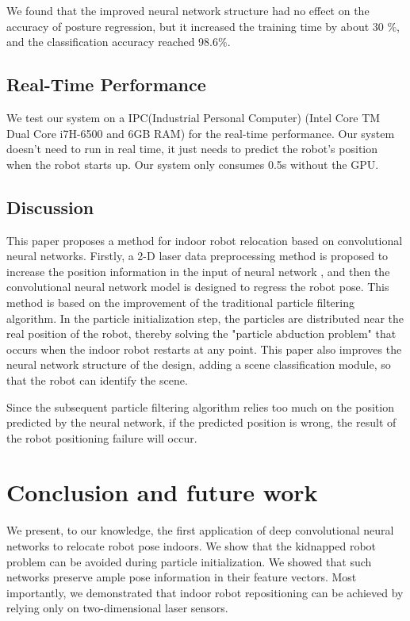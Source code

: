 \documentclass[journal]{IEEEtran}
\begin{document}
We found that the improved neural network structure had no effect on the accuracy of posture regression, but it increased the training time by about 30 $\%$, and the classification accuracy reached 98.6$\%$.


\subsection{Real-Time Performance}

We test our system on a IPC(Industrial Personal Computer) (Intel Core TM Dual Core i7H-6500 and 6GB RAM) for the real-time performance. Our system doesn't need to run in real time, it just needs to predict the robot's position when the robot starts up. Our system only consumes 0.5s without the GPU.


\subsection{Discussion}


This paper proposes a method for indoor robot relocation based on convolutional neural networks. Firstly, a 2-D laser data preprocessing method is proposed to increase the position information in the input of neural network , and then the convolutional neural network model is designed to regress the robot pose. This method is based on the improvement of the traditional particle filtering algorithm. In the particle initialization step, the particles are distributed near the real position of the robot, thereby solving the "particle abduction problem" that occurs when the indoor robot restarts at any point. This paper also improves the neural network structure of the design, adding a scene classification module, so that the robot can identify the scene.

Since the subsequent particle filtering algorithm relies too much on the position predicted by the neural network, if the predicted position is wrong, the result of the robot positioning failure will occur.


\section{Conclusion and future work}

We present, to our knowledge, the first application of deep convolutional neural networks to  relocate robot pose indoors. We show that the kidnapped robot problem can be avoided during particle initialization. We showed that such networks preserve ample pose information in their feature vectors. Most importantly, we demonstrated that indoor robot repositioning can be achieved by relying only on two-dimensional laser sensors.
\end{document}

